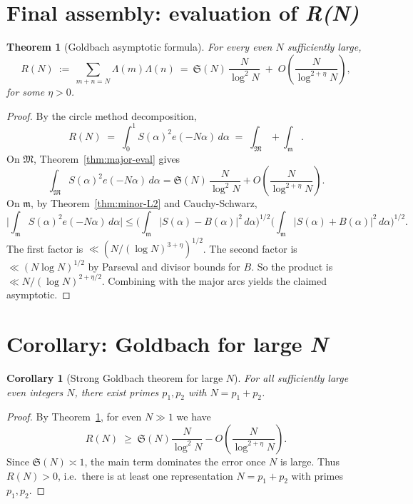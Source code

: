 \documentclass[11pt]{article}
\newtheorem{theorem}[lemma]{Theorem}
\newtheorem{corollary}[lemma]{Corollary}
\theoremstyle{definition}
\theoremstyle{remark}
\numberwithin{equation}{part}
\begin{document}
\section{Final assembly: evaluation of \textit{R(N)}}

\begin{theorem}[Goldbach asymptotic formula]\label{thm:goldbach-asymptotic}
	For every even $N$ sufficiently large,
	\[
		R(N)\ :=\ \sum_{m+n=N} \Lambda(m)\Lambda(n)
		\ =\ \mathfrak S(N)\,\frac{N}{\log^2 N}
		\;+\; O\!\left(\frac{N}{\log^{2+\eta} N}\right),
	\]
	for some $\eta>0$.
\end{theorem}

\begin{proof}
	By the circle method decomposition,
	\[
		R(N) \;=\;\int_0^1 S(\alpha)^2 e(-N\alpha)\,d\alpha
		\;=\;\int_{\mathfrak M}+\int_{\mathfrak m}.
	\]
	On $\mathfrak M$, Theorem~\ref{thm:major-eval} gives
	\[
		\int_{\mathfrak M} S(\alpha)^2 e(-N\alpha)\,d\alpha
		= \mathfrak S(N)\,\frac{N}{\log^2 N} + O\!\left(\frac{N}{\log^{2+\eta}N}\right).
	\]
	On $\mathfrak m$, by Theorem~\ref{thm:minor-L2} and Cauchy-Schwarz,
	\[
		\Biggl|\int_{\mathfrak m} S(\alpha)^2 e(-N\alpha)\,d\alpha\Biggr|
		\le \Biggl(\int_{\mathfrak m}|S(\alpha)-B(\alpha)|^2\,d\alpha\Biggr)^{1/2}
		\Biggl(\int_{\mathfrak m}|S(\alpha)+B(\alpha)|^2\,d\alpha\Biggr)^{1/2}.
	\]
	The first factor is $\ll (N/(\log N)^{3+\eta})^{1/2}$.
	The second factor is $\ll (N\log N)^{1/2}$ by Parseval and divisor bounds for $B$.
	So the product is $\ll N/(\log N)^{2+\eta/2}$.
	Combining with the major arcs yields the claimed asymptotic.
\end{proof}

\section{Corollary: Goldbach for large \textit{N}}

\begin{corollary}[Strong Goldbach theorem for large $N$]\label{cor:goldbach}
	For all sufficiently large even integers $N$, there exist primes $p_1,p_2$ with $N=p_1+p_2$.
\end{corollary}

\begin{proof}
	By Theorem~\ref{thm:goldbach-asymptotic}, for even $N\gg1$ we have
	\[
		R(N)\;\ge\;\mathfrak S(N)\frac{N}{\log^2 N} - O\!\left(\frac{N}{\log^{2+\eta}N}\right).
	\]
	Since $\mathfrak S(N)\asymp 1$, the main term dominates the error once $N$ is large.
	Thus $R(N)>0$, i.e.\ there is at least one representation $N=p_1+p_2$ with primes $p_1,p_2$.
\end{proof}
\end{document}
